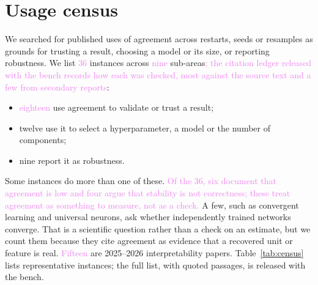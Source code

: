 \documentclass[10pt]{article}
\newcommand{\draft}[1]{\textcolor{violet}{#1}}
\begin{document}
\section{Usage census}
\label{app:census}
We searched for published uses of agreement across restarts, seeds or resamples as grounds
for trusting a result, choosing a model or its size, or reporting robustness. We list \draft{36}
instances across \draft{nine} sub-areas\draft{; the citation ledger released with the bench records
how each was checked, most against the source text and a few from secondary reports}:
\begin{itemize}
  \item \draft{eighteen} use agreement to validate or trust a result;
  \item twelve use it to select a hyperparameter, a model or the number of components;
  \item nine report it as robustness.
\end{itemize}
Some instances do more than one of these. \draft{Of the 36, six document that agreement is low
and four argue that stability is not correctness; these treat agreement as something to
measure, not as a check.} A few, such as convergent learning and universal neurons, ask whether
independently trained networks converge. That is a scientific question rather than a check on
an estimate, but we count them because they cite agreement as evidence that a recovered unit or
feature is real. \draft{Fifteen} are 2025--2026 interpretability papers.
Table~\ref{tab:census} lists representative instances; the full list, with quoted passages, is
released with the bench.
\end{document}
